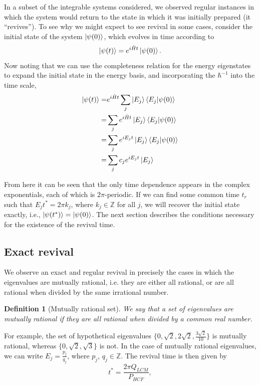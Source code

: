 \documentclass[a4paper,10pt]{article}
\theoremstyle{plain}
\newtheorem{definition}[]{Definition}
\begin{document}
In a subset of the integrable systems considered, we observed regular instances 
in which the system would return to the state in which it was initially 
prepared (it ``revives''). To see why we might expect to see revival in 
some cases, consider the initial state of the system $\ket{\psi(0)}$, which 
evolves in time according to
\begin{equation}
 \ket{\psi(t)}=e^{i\hat{H}t}\ket{\psi(0)}.
\end{equation}
Now noting that we can use the completeness relation for the energy eigenstates 
to expand the initial state in the energy basis, and incorporating the 
$\hbar^{-1}$ into the time scale,
\begin{align}
\label{time_evolution}
 \ket{\psi(t)} =&e^{i\hat{H}t}\sum_j\ket{E_j}\braket{E_j|\psi(0)}  \nonumber \\
               =&\sum_je^{i\hat{H}t}\ket{E_j}\braket{E_j|\psi(0)} \nonumber \\
                =&\sum_je^{iE_{j}t}\ket{E_j}\braket{E_j|\psi(0)}  \nonumber \\
                =&\sum_j c_{j}e^{iE_{j}t}\ket{E_j}             
\end{align}

From here it can be seen that the only time dependence appears in the complex 
exponentials, each of which is $2\pi$-periodic. If we can find some common 
time $t_r$ such that $E_{j} t^*=2 \pi k_{j}$, where $k_{j} \in \mathbb{Z} $ 
for all $j$, we will recover the initial state exactly, i.e., 
$\ket{\psi(t^*)}=\ket{\psi(0)}$. The next section describes the conditions 
necessary for the existence of the revival time.\\


\subsection{Exact revival}

We observe an exact and regular revival in precisely the cases in which the
eigenvalues are mutually rational, i.e. they are either all rational, or are all
rational when divided by the same irrational number.
\begin{definition}[Mutually rational set]
    We say that a set of eigenvalues are mutually rational if they are all
    rational when divided by a common real number.
\end{definition}

For example, the set of
hypothetical eigenvalues $\lbrace 0, \sqrt{2}, 2 \sqrt{2}, \frac{3 \sqrt{2}}{10}
\rbrace$ is mutually rational, whereas $\lbrace 0, \sqrt{2}, \sqrt{3}\rbrace$ is
not. In the case of mutually rational eigenvalues, we can write $E_{j} =
\frac{p_{j}}{q_{j}}$, where $p_{j}$, $q_{j} \in \mathbb{Z}$. The revival time is
then given by 
\begin{equation}
\label{revival_time_formula}
 t^* = \frac{2\pi Q_{LCM}}{P_{HCF}},
\end{equation}
\end{document}
